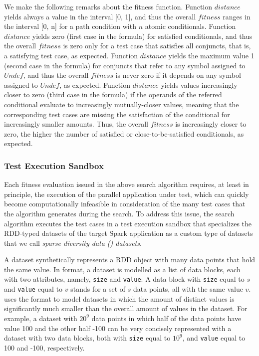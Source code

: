 We make the following remarks about the \approach fitness function. Function $distance$ yields always a value in the interval [0, 1], and thus the overall $fitness$ ranges in the interval [0, n] for a path condition with $n$ atomic conditionals. Function $distance$ yields zero (first case in the formula) for satisfied conditionals, and thus the overall $fitness$ is zero only for a test case that satisfies all conjuncts, that is, a satisfying test case, as expected.  Function $distance$ yields the maximum value 1 (second case in the formula) for conjuncts that refer to any symbol assigned to $Undef$, and thus the overall $fitness$ is never zero if it depends on any symbol assigned to $Undef$, as expected. Function $distance$ yields values increasingly closer to zero (third case in the formula) if the operands of the referred conditional evaluate to increasingly mutually-closer values, meaning that the corresponding test cases are missing the satisfaction of the conditional for increasingly smaller amounts. Thus, the overall $fitness$ is  increasingly closer to zero, the higher the number of satisfied or close-to-be-satisfied conditionals, as expected.



\subsubsection{Test Execution Sandbox}
Each fitness evaluation issued in the above search algorithm requires, at least in principle,  the execution of the parallel application under test, which can quickly become computationally infeasible in consideration of the many test cases that the algorithm generates during the search. To address this issue, the \approach search algorithm executes the test cases in a test execution sandbox that specializes the RDD-typed datasets of the target Spark application as a custom type of datasets that we call \emph{sparse diversity data (\sparsedata) datasets}. 

A \sparsedata dataset  synthetically represents a RDD object with many data points that hold the same value. In \sparsedata format, a dataset is modelled as a list of data blocks, each with two attributes, namely, \texttt{size} and \texttt{value}: A data block with \texttt{size} equal to $s$ and \texttt{value} equal to $v$ 
stands for a set of $s$ data points, all with the same value $v$.  \approach uses the \sparsedata format to model datasets in which the amount of distinct values is significantly much smaller than the overall amount of values in the dataset. For example, a dataset with $20^9$ data points in which half of the data points have value 100 and the other half -100 can be very concisely represented with a \sparsedata dataset with two data blocks, both with \texttt{size} equal to $10^9$, and \texttt{value} equal to 100 and -100, respectively. 

